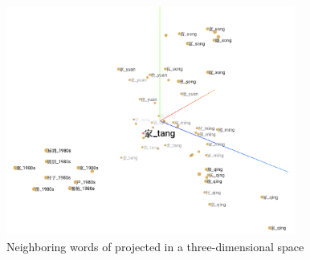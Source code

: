 \begin{figure}[H]
\centering
\includegraphics[height=0.45\textheight,width=0.85\textwidth,keepaspectratio]{figures/jia_neighboring_words}
\caption{Neighboring words of \jia projected in a three-dimensional space}
\label{fig:jia_neighboring_words}
\end{figure}


